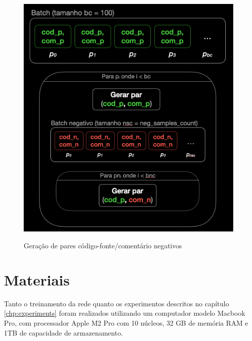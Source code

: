 \begin{figure}[H]
    \centering
        \caption{Geração de pares código-fonte/comentário negativos}
        \includegraphics[scale=0.6]{neg_samples_gen.png}
        \label{fig:metodology-neg_samples_gen_diagram}
\end{figure}

\section{Materiais}
Tanto o treinamento da rede quanto os experimentos descritos no capítulo \ref{chp:experiments} foram realizados utilizando um computador modelo Macbook Pro, com processador Apple M2 Pro com 10 núcleos, 32 GB de memória RAM e 1TB de capacidade de armazenamento.